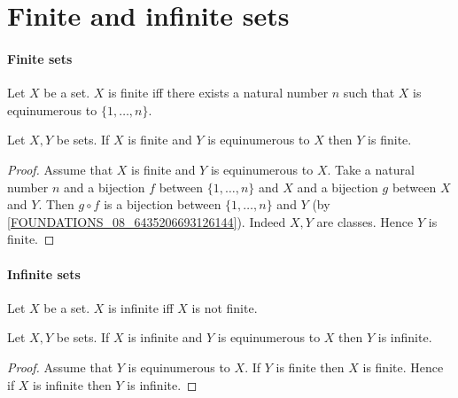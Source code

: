 \documentclass[../arithmetic.tex]{subfiles}
\begin{document}
  \section{Finite and infinite sets}

  \paragraph{Finite sets}

  \begin{forthel}
    \begin{definition}
      Let $X$ be a set.
      $X$ is finite iff there exists a natural number $n$ such that $X$ is
      equinumerous to $\{ 1, \dots, n \}$.
    \end{definition}
  \end{forthel}

  \begin{forthel}
    \begin{proposition}
      Let $X, Y$ be sets.
      If $X$ is finite and $Y$ is equinumerous to $X$ then $Y$ is finite.
    \end{proposition}
    \begin{proof}
      Assume that $X$ is finite and $Y$ is equinumerous to $X$.
      Take a natural number $n$ and a bijection $f$ between $\{ 1, \dots, n \}$
      and $X$ and a bijection $g$ between $X$ and $Y$.
      Then $g \circ f$ is a bijection between $\{ 1, \dots, n \}$ and $Y$
      (by \cref{FOUNDATIONS_08_6435206693126144}).
      Indeed $X, Y$ are classes.
      Hence $Y$ is finite.
    \end{proof}
  \end{forthel}


  \paragraph{Infinite sets}

  \begin{forthel}
    \begin{definition}
      Let $X$ be a set.
      $X$ is infinite iff $X$ is not finite.
    \end{definition}
  \end{forthel}

  \begin{forthel}
    \begin{proposition}
      Let $X, Y$ be sets.
      If $X$ is infinite and $Y$ is equinumerous to $X$ then $Y$ is infinite.
    \end{proposition}
    \begin{proof}
      Assume that $Y$ is equinumerous to $X$.
      If $Y$ is finite then $X$ is finite.
      Hence if $X$ is infinite then $Y$ is infinite.
    \end{proof}
  \end{forthel}
\end{document}
